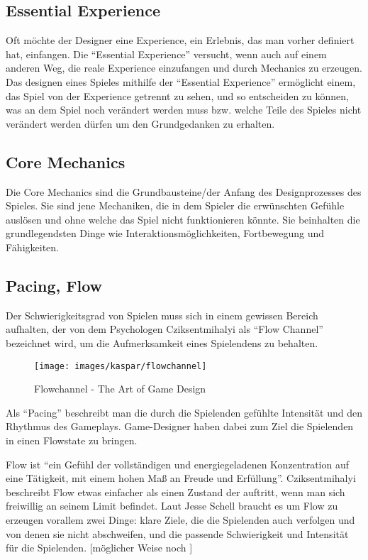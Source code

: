 \subsection{Essential Experience}

Oft möchte der Designer eine Experience, ein Erlebnis, das man vorher definiert hat, einfangen. Die "`Essential Experience"' versucht, wenn auch auf einem anderen Weg, die reale Experience einzufangen und durch Mechanics zu erzeugen. Das designen eines Spieles mithilfe der "`Essential Experience"' ermöglicht einem, das Spiel von der Experience getrennt zu sehen, und so entscheiden zu können, was an dem Spiel noch verändert werden muss bzw. welche Teile des Spieles nicht verändert werden dürfen um den Grundgedanken zu erhalten\cite[S.55]{_art_of_gamedesign}.

\subsection{Core Mechanics}

Die Core Mechanics sind die Grundbausteine/der Anfang des Designprozesses des Spieles. Sie sind jene Mechaniken, die in dem Spieler die erwünschten Gefühle auslösen und ohne welche das Spiel nicht funktionieren könnte. Sie beinhalten die grundlegendsten Dinge wie Interaktionsmöglichkeiten, Fortbewegung und Fähigkeiten.

\subsection{Pacing, Flow\label{_flow}}

Der Schwierigkeitsgrad von Spielen muss sich in einem gewissen Bereich aufhalten, der von dem Psychologen Cziksentmihalyi als "`Flow Channel"' bezeichnet wird, um die Aufmerksamkeit eines Spielendens zu behalten\cite[S.205]{_art_of_gamedesign}.

\begin{figure}[H]
	\centering
	\texttt{[image: images/kaspar/flowchannel]}
	\caption{Flowchannel - The Art of Game Design\cite{_art_of_gamedesign}}
\end{figure}

Als "`Pacing"' beschreibt man die durch die Spielenden gefühlte Intensität und den Rhythmus des Gameplays\cite{_the_level_design_book}. Game-Designer haben dabei zum Ziel die Spielenden in einen Flowstate zu bringen.

Flow ist "`ein Gefühl der vollständigen und energiegeladenen Konzentration auf eine Tätigkeit, mit einem hohen Maß an Freude und Erfüllung"'\cite[S.204]{_art_of_gamedesign}.
Cziksentmihalyi beschreibt Flow etwas einfacher als einen Zustand der auftritt, wenn man sich freiwillig an seinem Limit befindet\cite{_flow}.
Laut Jesse Schell braucht es um Flow zu erzeugen vorallem zwei Dinge: klare Ziele, die die Spielenden auch verfolgen und von denen sie nicht abschweifen, und die passende Schwierigkeit und Intensität für die Spielenden\cite{_art_of_gamedesign}.
[möglicher Weise noch \cite{_theory_of_fun}]

